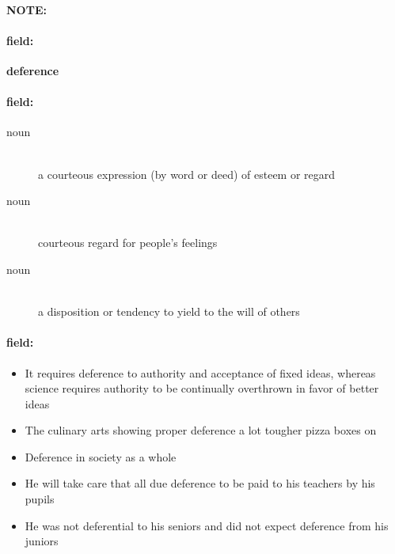 \documentclass[12pt]{article}
\newenvironment{note}{\paragraph{NOTE:}}{}
\newenvironment{field}{\paragraph{field:}}{}
\begin{document}
\begin{note}
\begin{field}
\textbf{\large deference}
\end{field}


\begin{field}
\begin{description}
\item[noun] \hfill \\ 
a courteous expression (by word or deed) of esteem or regard

\item[noun] \hfill \\ 
courteous regard for people's feelings

\item[noun] \hfill \\ 
a disposition or tendency to yield to the will of others

\end{description}
\end{field}

\begin{field}
\begin{itemize}
\item It requires deference to authority and acceptance of fixed ideas, whereas science requires authority to be continually overthrown in favor of better ideas
\item The culinary arts showing proper deference a lot tougher pizza boxes on
\item Deference in society as a whole
\item He will take care that all due deference to be paid to his teachers by his pupils
\item He was not deferential to his seniors and did not expect deference from his juniors
\end{itemize}
\end{field}
\end{note}
\end{document}
